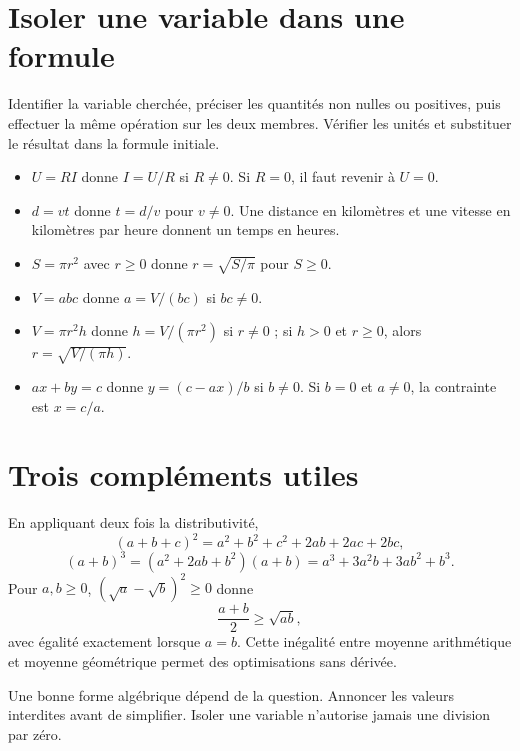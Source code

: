 \documentclass[../cours_2de.tex]{subfiles}
\begin{document}
\section{Isoler une variable dans une formule}
\begin{methode}
Identifier la variable cherchée, préciser les quantités non nulles ou positives, puis effectuer la même opération sur les deux membres. Vérifier les unités et substituer le résultat dans la formule initiale.
\end{methode}
\begin{itemize}
\item $U=RI$ donne $I=U/R$ si $R\ne0$. Si $R=0$, il faut revenir à $U=0$.
\item $d=vt$ donne $t=d/v$ pour $v\ne0$. Une distance en kilomètres et une vitesse en kilomètres par heure donnent un temps en heures.
\item $S=\pi r^2$ avec $r\ge0$ donne $r=\sqrt{S/\pi}$ pour $S\ge0$.
\item $V=abc$ donne $a=V/(bc)$ si $bc\ne0$.
\item $V=\pi r^2h$ donne $h=V/(\pi r^2)$ si $r\ne0$ ; si $h>0$ et $r\ge0$, alors $r=\sqrt{V/(\pi h)}$.
\item $ax+by=c$ donne $y=(c-ax)/b$ si $b\ne0$. Si $b=0$ et $a\ne0$, la contrainte est $x=c/a$.
\end{itemize}
\section{Trois compléments utiles}
\approfondissement En appliquant deux fois la distributivité,
\[
(a+b+c)^2=a^2+b^2+c^2+2ab+2ac+2bc,
\]
\[
(a+b)^3=(a^2+2ab+b^2)(a+b)=a^3+3a^2b+3ab^2+b^3.
\]
Pour $a,b\ge0$, $(\sqrt a-\sqrt b)^2\ge0$ donne
\[
\frac{a+b}{2}\ge\sqrt{ab},
\]
avec égalité exactement lorsque $a=b$. Cette inégalité entre moyenne arithmétique et moyenne géométrique permet des optimisations sans dérivée.
\begin{retenir}
Une bonne forme algébrique dépend de la question. Annoncer les valeurs interdites avant de simplifier. Isoler une variable n'autorise jamais une division par zéro.
\end{retenir}
\end{document}
